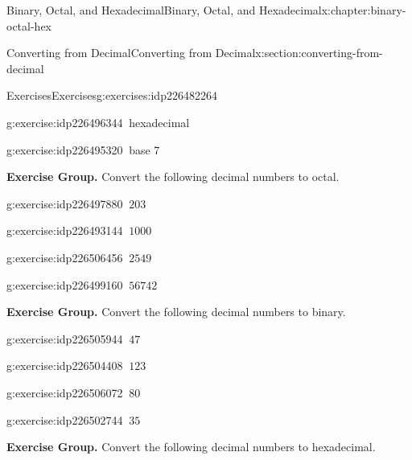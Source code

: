 \documentclass[twoside,10pt,]{book}
\numberwithin{equation}{section}
\begin{document}
\begin{chapterptx}{Binary, Octal, and Hexadecimal}{}{Binary, Octal, and Hexadecimal}{}{}{x:chapter:binary-octal-hex}
\begin{sectionptx}{Converting from Decimal}{}{Converting from Decimal}{}{}{x:section:converting-from-decimal}
\begin{exercises-subsection}{Exercises}{}{Exercises}{}{}{g:exercises:idp226482264}
\begin{exercisegroup}
\begin{divisionexerciseeg}{15}{}{}{g:exercise:idp226496344}
\(\ \)hexadecimal\end{divisionexerciseeg}%
\begin{divisionexerciseeg}{16}{}{}{g:exercise:idp226495320}%
\(\ \)base 7\end{divisionexerciseeg}%
\end{exercisegroup}
\par\medskip\noindent
\par\medskip\noindent%
\textbf{Exercise Group.}\space\space%
Convert the following decimal numbers to octal.\begin{exercisegroup}
\begin{divisionexerciseeg}{17}{}{}{g:exercise:idp226497880}%
\(\ 203\)\end{divisionexerciseeg}%
\begin{divisionexerciseeg}{18}{}{}{g:exercise:idp226493144}%
\(\ 1000\)\end{divisionexerciseeg}%
\begin{divisionexerciseeg}{19}{}{}{g:exercise:idp226506456}%
\(\ 2549\)\end{divisionexerciseeg}%
\begin{divisionexerciseeg}{20}{}{}{g:exercise:idp226499160}%
\(\ 56742\)\end{divisionexerciseeg}%
\end{exercisegroup}
\par\medskip\noindent
\par\medskip\noindent%
\textbf{Exercise Group.}\space\space%
Convert the following decimal numbers to binary.\begin{exercisegroup}
\begin{divisionexerciseeg}{21}{}{}{g:exercise:idp226505944}%
\(\ 47\)\end{divisionexerciseeg}%
\begin{divisionexerciseeg}{22}{}{}{g:exercise:idp226504408}%
\(\ 123\)\end{divisionexerciseeg}%
\begin{divisionexerciseeg}{23}{}{}{g:exercise:idp226506072}%
\(\ 80\)\end{divisionexerciseeg}%
\begin{divisionexerciseeg}{24}{}{}{g:exercise:idp226502744}%
\(\ 35\)\end{divisionexerciseeg}%
\end{exercisegroup}
\par\medskip\noindent
\par\medskip\noindent%
\textbf{Exercise Group.}\space\space%
Convert the following decimal numbers to hexadecimal.\begin{exercisegroup}

\end{exercisegroup}
\end{exercises-subsection}
\end{sectionptx}
\end{chapterptx}
\end{document}
